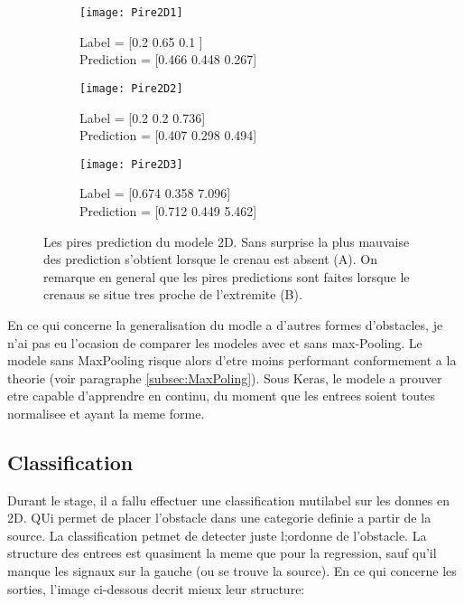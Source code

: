     \begin{figure}[H]
    \begin{subfigure}{.33\textwidth}
    \centering
    \texttt{[image: Pire2D1]}  
    \caption[Pire2D1]{Label = [0.2  0.65 0.1 ] \\ Prediction = [0.466 0.448 0.267]}
    \end{subfigure}
    \begin{subfigure}{.33\textwidth}
    \centering
    \texttt{[image: Pire2D2]}  
    \caption[Pire2D2]{Label = [0.2   0.2   0.736]  \\ Prediction = [0.407 0.298 0.494]}
    \end{subfigure}
    \begin{subfigure}{.33\textwidth}
    \centering
    \texttt{[image: Pire2D3]}  
    \caption[Pire2D3]{Label = [0.674 0.358 7.096]  \\ Prediction = [0.712 0.449 5.462]}
    \end{subfigure}

     \centering
    \decoRule
    \caption[Pire2D]{Les pires prediction du modele 2D. Sans surprise la plus mauvaise des prediction s'obtient lorsque le crenau est absent (A). On remarque en general que les pires predictions sont faites lorsque le crenaus se situe tres proche de l'extremite (B).}
    \label{fig:Pire2D}
    \end{figure}
    
    En ce qui concerne la generalisation du modle a d'autres formes d'obstacles, je n'ai pas eu l'ocasion de comparer les modeles avec et sans max-Pooling. Le modele sans MaxPooling risque alors d'etre moins performant conformement a la theorie (voir paragraphe \ref{subsec:MaxPoling}). Sous Keras, le modele a prouver etre capable d'apprendre en continu, du moment que les entrees soient toutes normalisee et ayant la meme forme.

\subsection{Classification}
Durant le stage, il a fallu effectuer une classification mutilabel sur les donnes en 2D. QUi permet de placer l'obstacle dans une categorie definie a partir de la source. La classification petmet de detecter juste l;ordonne de l'obstacle. La structure des entrees est quasiment la meme que pour la regression, sauf qu'il manque les signaux sur la gauche (ou se trouve la source). En ce qui concerne les sorties, l'image ci-dessous decrit mieux leur structure:

